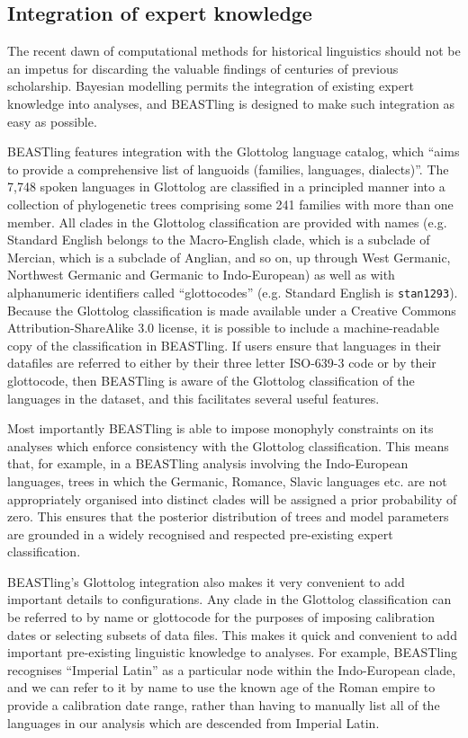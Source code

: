 \documentclass[twocolumn,10pt]{scrartcl}
\begin{document}
\subsection{Integration of expert knowledge}

The recent dawn of computational methods for historical linguistics should not be an impetus for discarding the valuable findings of centuries of previous scholarship.  Bayesian modelling permits the integration of existing expert knowledge into analyses, and BEASTling is designed to make such integration as easy as possible.

BEASTling features integration with the Glottolog language catalog\cite{Hammarstroem2016}, which ``aims to provide a comprehensive list of languoids (families, languages, dialects)''.  The 7,748 spoken languages in Glottolog are classified in a principled manner into a collection of phylogenetic trees comprising some 241 families with more than one member.  All clades in the Glottolog classification are provided with names (e.g. Standard English belongs to the Macro-English clade, which is a subclade of Mercian, which is a subclade of Anglian, and so on, up through West Germanic, Northwest Germanic and Germanic to Indo-European) as well as with alphanumeric identifiers called ``glottocodes'' (e.g. Standard English is \texttt{stan1293}).  Because the Glottolog classification is made available under a Creative Commons Attribution-ShareAlike 3.0 license, it is possible to include a machine-readable copy of the classification in BEASTling.  If users ensure that languages in their datafiles are referred to either by their three letter ISO-639-3 code or by their glottocode, then BEASTling is aware of the Glottolog classification of the languages in the dataset, and this facilitates several useful features.

Most importantly BEASTling is able to impose monophyly constraints on its analyses which enforce consistency with the Glottolog classification.  This means that, for example, in a BEASTling analysis involving the Indo-European languages, trees in which the Germanic, Romance, Slavic languages etc. are not appropriately organised into distinct clades will be assigned a prior probability of zero.  This ensures that the posterior distribution of trees and model parameters are grounded in a widely recognised and respected pre-existing expert classification.

BEASTling's Glottolog integration also makes it very convenient to add important details to configurations.  Any clade in the Glottolog classification can be referred to by name or glottocode for the purposes of imposing calibration dates or selecting subsets of data files.  This makes it quick and convenient to add important pre-existing linguistic knowledge to analyses.  For example, BEASTling recognises ``Imperial Latin'' as a particular node within the Indo-European clade, and we can refer to it by name to use the known age of the Roman empire to provide a calibration date range, rather than having to manually list all of the languages in our analysis which are descended from Imperial Latin.
\end{document}
